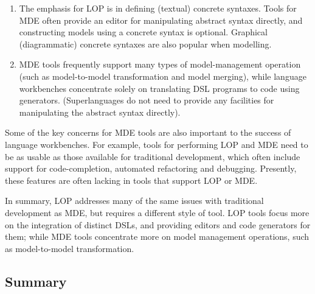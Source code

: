 \begin{enumerate}
 \item The emphasis for LOP is in defining (textual) concrete syntaxes. Tools for MDE often provide an editor for manipulating abstract syntax directly, and constructing models using a concrete syntax is optional. Graphical (diagrammatic) concrete syntaxes are also popular when modelling.
 \item MDE tools frequently support many types of model-management operation (such as model-to-model transformation and model merging), while language workbenches concentrate solely on translating DSL programs to code using generators. (Superlanguages do not need to provide any facilities for manipulating the abstract syntax directly).
\end{enumerate}

Some of the key concerns for MDE tools are also important to the success of language workbenches. For example, tools for performing LOP and MDE need to be as usable as those available for traditional development, which often include support for code-completion, automated refactoring and debugging. Presently, these features are often lacking in tools that support LOP or MDE.

In summary, LOP addresses many of the same issues with traditional development as MDE, but requires a different style of tool. LOP tools focus more on the integration of distinct DSLs, and providing editors and code generators for them; while MDE tools concentrate more on model management operations, such as model-to-model transformation.

\subsection{Summary}
